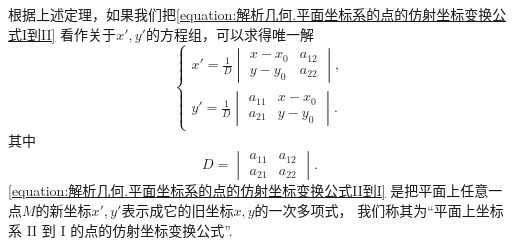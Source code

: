 根据上述定理，如果我们把\cref{equation:解析几何.平面坐标系的点的仿射坐标变换公式I到II}
看作关于\(x',y'\)的方程组，可以求得唯一解
\begin{equation}\label{equation:解析几何.平面坐标系的点的仿射坐标变换公式II到I}
	\left\{ \begin{array}{l}
		x' = \frac{1}{D} \begin{vmatrix}
			x - x_0 & a_{12} \\
			y - y_0 & a_{22}
		\end{vmatrix}, \\
		y' = \frac{1}{D} \begin{vmatrix}
			a_{11} & x - x_0 \\
			a_{21} & y - y_0
		\end{vmatrix}.
	\end{array} \right.
\end{equation}
其中\begin{equation*}
	D = \begin{vmatrix}
		a_{11} & a_{12} \\
		a_{21} & a_{22}
	\end{vmatrix}.
\end{equation*}
\cref{equation:解析几何.平面坐标系的点的仿射坐标变换公式II到I}
是把平面上任意一点\(M\)的新坐标\(x',y'\)表示成它的旧坐标\(x,y\)的一次多项式，
我们称其为“平面上坐标系 II 到 I 的点的仿射坐标变换公式”.

